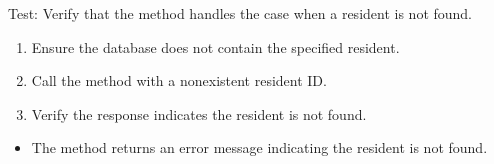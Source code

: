 \documentclass[letterpaper,10pt,english]{sphinxmanual}
\begin{document}
\begin{fulllineitems}
\label{\detokenize{test:test.test_residetnt.test_update_resident_gender_not_found}}
\pysigstartsignatures
\pysiglinewithargsret
{}
{}
{}
\pysigstopsignatures
\sphinxAtStartPar
Test: Verify that the method handles the case when a resident is not found.
\begin{description}
\begin{enumerate}
%
\item {} 
\sphinxAtStartPar
Ensure the database does not contain the specified resident.

\item {} 
\sphinxAtStartPar
Call the  method with a non\sphinxhyphen{}existent resident ID.

\item {} 
\sphinxAtStartPar
Verify the response indicates the resident is not found.

\end{enumerate}

\begin{itemize}
\item {} 
\sphinxAtStartPar
The method returns an error message indicating the resident is not found.

\end{itemize}

\end{description}

\end{fulllineitems}

\end{document}
